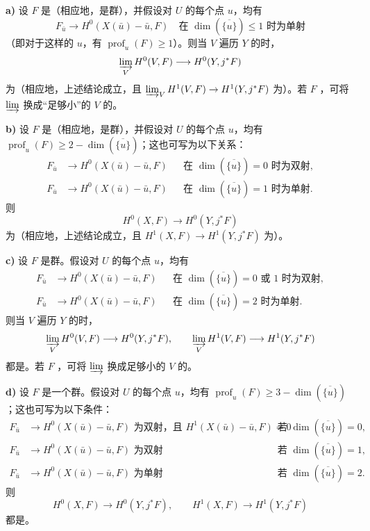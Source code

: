 \textbf{a)} 设 $F$ 是（相应地，是群），并假设对 $U$ 的每个点 $u$，均有
\[
F_{\bar u}\longrightarrow H^0(X(\bar u)-\bar u,F)
\quad\text{在 }\dim(\overline{\{u\}})\leq1\text{ 时为单射}
\]
（即对于这样的 $u$，有 $\operatorname{prof}_u(F)\geq1$）。则当 $V$ 遍历 $Y$ 的时，
\[
\varinjlim_V H^0(V,F)\longrightarrow H^0(Y,j^*F)
\]
为（相应地，上述结论成立，且 $\varinjlim_VH^1(V,F)\to H^1(Y,j^*F)$ 为）。若 $F$ ，可将 $\varinjlim$ 换成“足够小”的 $V$ 的。

\textbf{b)} 设 $F$ 是（相应地，是群），并假设对 $U$ 的每个点 $u$，均有 $\operatorname{prof}_u(F)\geq2-\dim(\overline{\{u\}})$；这也可写为以下关系：
\[
\begin{aligned}
F_{\bar u}&\longrightarrow H^0(X(\bar u)-\bar u,F)
&&\text{在 }\dim(\overline{\{u\}})=0\text{ 时为双射},\\
F_{\bar u}&\longrightarrow H^0(X(\bar u)-\bar u,F)
&&\text{在 }\dim(\overline{\{u\}})=1\text{ 时为单射}.
\end{aligned}
\]
则
\[
H^0(X,F)\longrightarrow H^0(Y,j^*F)
\]
为（相应地，上述结论成立，且 $H^1(X,F)\to H^1(Y,j^*F)$ 为）。

\textbf{c)} 设 $F$ 是群。假设对 $U$ 的每个点 $u$，均有
\[
\begin{aligned}
F_{\bar u}&\longrightarrow H^0(X(\bar u)-\bar u,F)
&&\text{在 }\dim(\overline{\{u\}})=0\text{ 或 }1\text{ 时为双射},\\
F_{\bar u}&\longrightarrow H^0(X(\bar u)-\bar u,F)
&&\text{在 }\dim(\overline{\{u\}})=2\text{ 时为单射}.
\end{aligned}
\]
则当 $V$ 遍历 $Y$ 的时，
\[
\varinjlim_VH^0(V,F)\longrightarrow H^0(Y,j^*F),\qquad
\varinjlim_VH^1(V,F)\longrightarrow H^1(Y,j^*F)
\]
都是。若 $F$ ，可将 $\varinjlim$ 换成足够小的 $V$ 的。

\textbf{d)} 设 $F$ 是一个群。假设对 $U$ 的每个点 $u$，均有 $\operatorname{prof}_u(F)\geq3-\dim(\overline{\{u\}})$；这也可写为以下条件：
\[
\begin{aligned}
F_{\bar u}&\longrightarrow H^0(X(\bar u)-\bar u,F)\text{ 为双射，且 }H^1(X(\bar u)-\bar u,F)=0
&&\text{若 }\dim(\overline{\{u\}})=0,\\
F_{\bar u}&\longrightarrow H^0(X(\bar u)-\bar u,F)\text{ 为双射}
&&\text{若 }\dim(\overline{\{u\}})=1,\\
F_{\bar u}&\longrightarrow H^0(X(\bar u)-\bar u,F)\text{ 为单射}
&&\text{若 }\dim(\overline{\{u\}})=2.
\end{aligned}
\]
则
\[
H^0(X,F)\longrightarrow H^0(Y,j^*F),\qquad
H^1(X,F)\longrightarrow H^1(Y,j^*F)
\]
都是。

